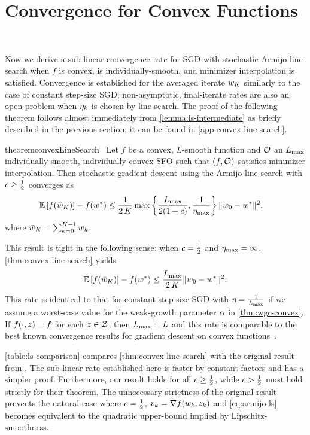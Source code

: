 \section{Convergence for Convex Functions}~\label{sec:ls-convex}

Now we derive a sub-linear convergence rate for \ac{SGD} with stochastic Armijo line-search when \( f \) is convex, \oracle{} is individually-smooth, and minimizer interpolation is satisfied.
Convergence is established for the averaged iterate \( \bar \w_K \) similarly to the case of constant step-size \ac{SGD};\@
non-asymptotic, final-iterate rates are also an open problem when \( \etak \) is chosen by line-search.
The proof of the following theorem follows almost immediately from \autoref{lemma:ls-intermediate} as briefly described in the previous section; it can be found in \autoref{app:convex-line-search}.

\begin{restatable}{theorem}{convexLineSearch}~\label{thm:convex-line-search}
    Let \( f \) be a convex, \( L \)-smooth function and \( \oracle{} \) an \( \Lmax \) individually-smooth, individually-convex \ac{SFO} such that \( \rbr{f, \oracle{}} \) satisfies minimizer interpolation.
    Then stochastic gradient descent using the Armijo line-search with \( c \geq \half \) converges as 
    \begin{align*}
        \E\sbr{f(\bar \w_K)} - f(\wopt) &\leq \frac{1}{2 \, K} \max\cbr{\frac{\Lmax}{2(1-c)}, \frac{1}{\etamax}} \norm{\w_0 - \wopt}^2, 
    \end{align*} 
    where \( \bar \w_K = \sum_{k=0}^{K-1} \wk \).
\end{restatable}
This result is tight in the following sense: when \( c = \half \) and \( \etamax = \infty \), \autoref{thm:convex-line-search} yields 
\[  \E\sbr{f(\bar \w_K)} - f(\wopt) \leq \frac{\Lmax}{2 \, K} \norm{\w_0 - \wopt}^2. \]
This rate is identical to that for constant step-size \ac{SGD} with \( \eta = \frac{1}{\Lmax} \) if we assume a worst-case value for the weak-growth parameter \( \wgc \) in \autoref{thm:wgc-convex}.
If \( f(\cdot, \z) = f \) for each \( z \in \calZ \), then \( \Lmax = L \) and this rate is comparable to the best known convergence results for gradient descent on convex functions~\citep{bubeck2015convex}. 

\autoref{table:ls-comparison} compares \autoref{thm:convex-line-search} with the original result from  \citet[Theorem 2]{vaswani2019painless}.
The sub-linear rate established here is faster by constant factors and has a simpler proof.
Furthermore, our result holds for all \( c \geq \half \), while \( c > \half \) must hold strictly for their theorem. 
The unnecessary strictness of the original result prevents the natural case where \( c = \half \),  \( v_k = \grad(\wk, \zk) \) and \autoref{eq:armijo-ls} becomes equivalent to the quadratic upper-bound implied by Lipschitz-smoothness.\\

